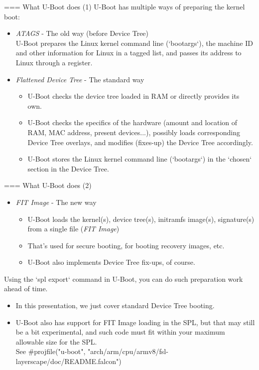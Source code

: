 === {What U-Boot does (1)}
  U-Boot has multiple ways of preparing the kernel boot:
  \begin{itemize}
    \item {\em ATAGS} - The old way (before Device Tree)\\
          U-Boot prepares the Linux kernel command
	  line (`bootargs`), the machine ID and other information for Linux in
	  a tagged list, and passes its address to Linux through a
	  register.
    \item {\em Flattened Device Tree} - The standard way
    \begin{itemize}
	\item U-Boot checks the device tree loaded in RAM
	      or directly provides its own.
	\item U-Boot checks the specifics of the hardware
	      (amount and location of RAM, MAC address, present
	      devices...), possibly loads corresponding Device Tree overlays,
	      and modifies (fixes-up) the Device Tree accordingly.
	\item U-Boot stores the Linux kernel command line
	      (`bootargs`) in the `chosen` section
	      in the Device Tree.
    \end{itemize}
  \end{itemize}


=== {What U-Boot does (2)}
  \begin{itemize}
    \item {\em FIT Image} - The new way
    \begin{itemize}
	\item U-Boot loads the kernel(s), device tree(s), initramfs
	      image(s), signature(s) from a single file ({\em FIT Image})
	\item That's used for secure booting, for booting recovery
	      images, etc.
	\item U-Boot also implements Device Tree fix-ups, of course.
    \end{itemize}
  \end{itemize}
  Using the `spl export` command in U-Boot, you can do such
  preparation work ahead of time.

  \begin{itemize}
     \item In this presentation, we just cover standard Device Tree
	   booting.
     \item U-Boot also has support for FIT Image loading in the SPL, but
           that may still be a bit experimental, and such code must fit
           within your maximum allowable size for the SPL.\\
           See #projfile("u-boot", "arch/arm/cpu/armv8/fsl-layerscape/doc/README.falcon")
  \end{itemize}


